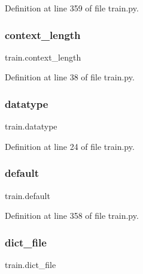 Definition at line 359 of file train.\+py.

\mbox{\label{namespacetrain_a8e3df31420b4b77bc79618c899785191}} 
\subsubsection{\texorpdfstring{context\+\_\+length}{context\_length}}
{\footnotesize\ttfamily train.\+context\+\_\+length}



Definition at line 38 of file train.\+py.

\mbox{\label{namespacetrain_ae42fa60655eba8aba94b03539cccf9cb}} 
\subsubsection{\texorpdfstring{datatype}{datatype}}
{\footnotesize\ttfamily train.\+datatype}



Definition at line 24 of file train.\+py.

\mbox{\label{namespacetrain_abfb9b8d0ebf72bafd04e084791275553}} 
\subsubsection{\texorpdfstring{default}{default}}
{\footnotesize\ttfamily train.\+default}



Definition at line 358 of file train.\+py.

\mbox{\label{namespacetrain_a3bdee0332f8c1f321ec0cc91cfbae4d7}} 
\subsubsection{\texorpdfstring{dict\+\_\+file}{dict\_file}}
{\footnotesize\ttfamily train.\+dict\+\_\+file}



